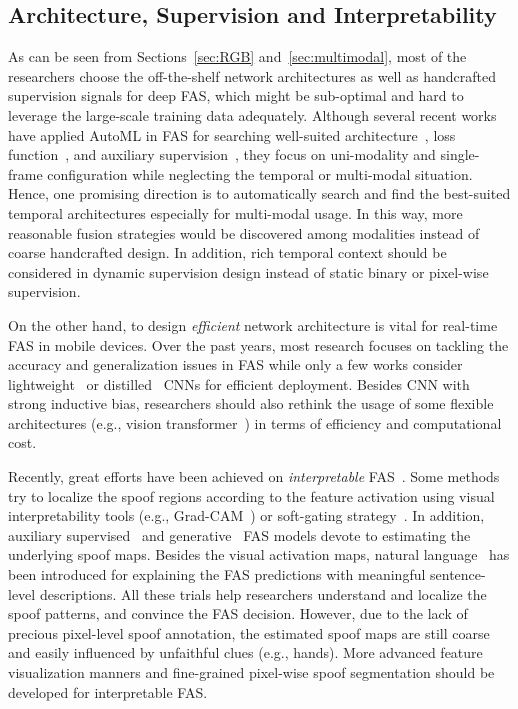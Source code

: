 \documentclass[10pt,journal,compsoc]{IEEEtran}
\begin{document}
\subsection{Architecture, Supervision and Interpretability}
As can be seen from Sections~\ref{sec:RGB} and~\ref{sec:multimodal}, most of the researchers choose the off-the-shelf network architectures as well as handcrafted supervision signals for deep FAS, which might be sub-optimal and hard to leverage the large-scale training data adequately. Although several recent works have applied AutoML in FAS for searching well-suited architecture~\cite{yu2020searching,yu2020fas2}, loss function~\cite{qin2020one}, and auxiliary supervision~\cite{qin2021meta}, they focus on uni-modality and single-frame configuration while neglecting the temporal or multi-modal situation. Hence, one promising direction is to automatically search and find the best-suited temporal architectures especially for multi-modal usage. In this way, more reasonable fusion strategies would be discovered among modalities instead of coarse handcrafted design. In addition, rich temporal context should be considered in dynamic supervision design instead of static binary or pixel-wise supervision.  

On the other hand, to design \textit{efficient} network architecture is vital for real-time FAS in mobile devices. Over the past years, most research focuses on tackling the accuracy and generalization issues in FAS while only a few works consider lightweight~\cite{yu2020auto2} or distilled~\cite{li2020face2} CNNs for efficient deployment. Besides CNN with strong inductive bias, researchers should also rethink the usage of some flexible architectures (e.g., vision transformer~\cite{yu2021transrppg,george2020effectiveness}) in terms of efficiency and computational cost. 


Recently, great efforts have been achieved on \textit{interpretable} FAS~\cite{sequeiraexploratory}. Some methods try to localize the spoof regions according to the feature activation using visual interpretability tools (e.g., Grad-CAM~\cite{selvaraju2017grad}) or soft-gating strategy~\cite{deb2020look}. In addition, auxiliary supervised~\cite{Liu2018Learning,yu2020face} and generative~\cite{jourabloo2018face,liu2020physics} FAS models devote to estimating the underlying spoof maps. Besides the visual activation maps, natural language~\cite{mirzaalian2021explaining} has been introduced for explaining the FAS predictions with meaningful sentence-level descriptions. All these trials help researchers understand and localize the spoof patterns, and convince the FAS decision. However, due to the lack of precious pixel-level spoof annotation, the estimated spoof maps are still coarse and easily influenced by unfaithful clues (e.g., hands). More advanced feature visualization manners and fine-grained pixel-wise spoof segmentation should be developed for interpretable FAS.  
\end{document}
